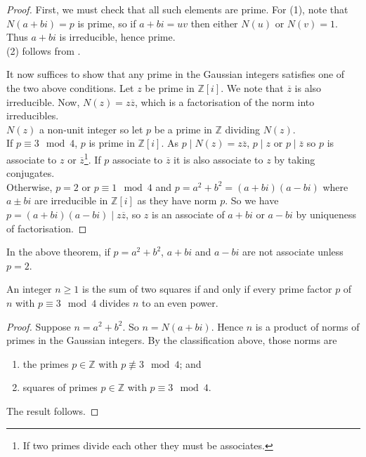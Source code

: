 \begin{proof}
	First, we must check that all such elements are prime.
	For (1), note that $N(a+bi) = p$ is prime, so if $a+bi = uv$ then either $N(u)$ or $N(v) = 1$. 
	Thus $a + bi$ is irreducible, hence prime. \\
	(2) follows from .

	It now suffices to show that any prime in the Gaussian integers satisfies one of the two above conditions.
	Let $z$ be prime in $\mathbb Z[i]$.
	We note that $\overline z$ is also irreducible.
	Now, $N(z) = z\overline z$, which is a factorisation of the norm into irreducibles. \\
	$N(z)$ a non-unit integer so let $p$ be a prime in $\mathbb Z$ dividing $N(z)$. \\
	If $p \equiv 3 \mod 4$, $p$ is prime in $\mathbb Z[i]$.
	As $p \mid N(z) = z \overline z$, $p \mid z$ or $p \mid \overline z$ so $p$ is associate to $z$ or $\overline z$\footnote{If two primes divide each other they must be associates.}. 
	If $p$ associate to $\overline z$ it is also associate to $z$ by taking conjugates. \\
	Otherwise, $p = 2$ or $p \equiv 1 \mod 4$ and $p = a^2 + b^2 = (a+bi)(a-bi)$ where $a \pm bi$ are irreducible in $\mathbb Z[i]$ as they have norm $p$.
	So we have $p = (a+bi)(a-bi) \mid z \overline z$, so $z$ is an associate of $a+bi$ or $a-bi$ by uniqueness of factorisation.
\end{proof}
\begin{remark}
	In the above theorem, if $p = a^2 + b^2$, $a+bi$ and $a-bi$ are not associate unless $p = 2$.
\end{remark}
\begin{corollary}
	An integer $n \geq 1$ is the sum of two squares if and only if every prime factor $p$ of $n$ with $p \equiv 3 \mod 4$ divides $n$ to an even power.
\end{corollary}
\begin{proof}
	Suppose $n = a^2 + b^2$.
	So $n = N(a+bi)$.
	Hence $n$ is a product of norms of primes in the Gaussian integers.
	By the classification above, those norms are
	\begin{enumerate}
		\item the primes $p \in \mathbb Z$ with $p \not\equiv 3 \mod 4$; and
		\item squares of primes $p \in \mathbb Z$ with $p \equiv 3 \mod 4$.
	\end{enumerate}
	The result follows.
\end{proof}
